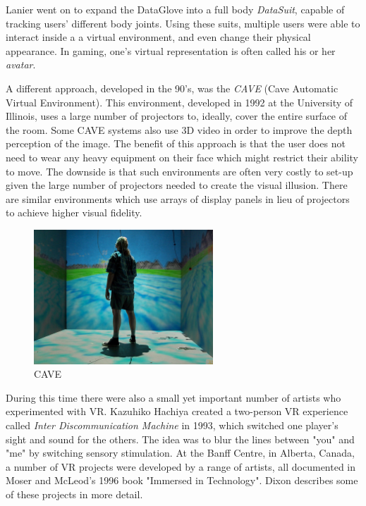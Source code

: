 Lanier went on to expand the DataGlove into a full body \textit{DataSuit}, capable of tracking users' different body joints. Using these suits, multiple users were able to interact inside a a virtual environment, and even change their physical appearance. In gaming, one's virtual representation is often called his or her \textit{avatar}.

A different approach, developed in the 90's, was the \textit{CAVE} (Cave Automatic Virtual Environment). This environment, developed in 1992 at the University of Illinois, uses a large number of projectors to, ideally, cover the entire surface of the room. Some CAVE systems also use 3D video in order to improve the depth perception of the image. The benefit of this approach is that the user does not need to wear any heavy equipment on their face which might restrict their ability to move. The downside is that such environments are often very costly to set-up given the large number of projectors needed to create the visual illusion. There are similar environments which use arrays of display panels in lieu of projectors to achieve higher visual fidelity.

\begin{figure}[ht!]%
\centering
\includegraphics[width=0.6\textwidth]{img/cave.jpg} 
\caption{CAVE \cite{FileCAVE71online}}
\label{img:cave}
\end{figure}


During this time there were also a small yet important number of artists who experimented with VR. Kazuhiko Hachiya created a two-person VR experience called \textit{Inter Discommunication Machine} in 1993, which switched one player's sight and sound for the others. The idea was to blur the lines between "you" and "me" \cite{dixon2006history} by switching sensory stimulation. At the Banff Centre, in Alberta, Canada, a number of VR projects were developed by a range of artists, all documented in Moser and McLeod's 1996 book "Immersed in Technology". Dixon \cite{dixon2006history} describes some of these projects in more detail. 

